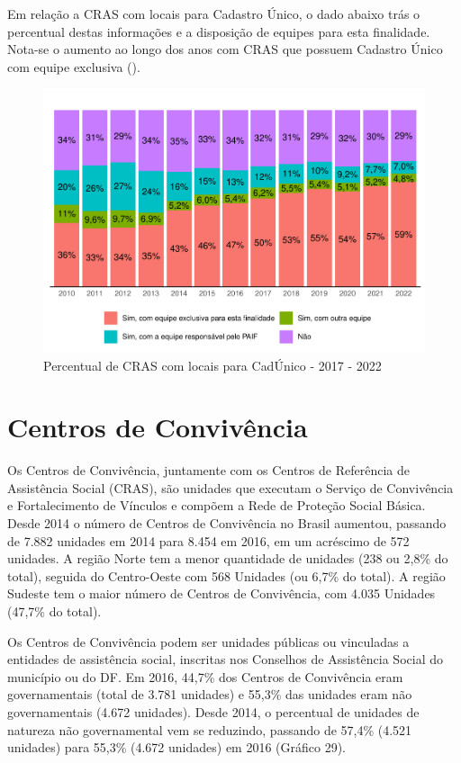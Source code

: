 \documentclass[
  brazilian]{report}
\begin{document}
Em relação a CRAS com locais para Cadastro Único, o dado abaixo trás o
percentual destas informações e a disposição de equipes para esta
finalidade. Nota-se o aumento ao longo dos anos com CRAS que possuem
Cadastro Único com equipe exclusiva ().

\begin{figure}
\includegraphics{Censo-SUAS-2022_files/figure-latex/equip-cadunico-cras-1} \caption[Percentual de CRAS com locais para CadÚnico - 2017 - 2022]{Percentual de CRAS com locais para CadÚnico - 2017 - 2022}\label{fig:equip-cadunico-cras}
\end{figure}

\hypertarget{centros-de-convivuxeancia}{%
\section{Centros de Convivência}\label{centros-de-convivuxeancia}}

Os Centros de Convivência, juntamente com os Centros de Referência de
Assistência Social (CRAS), são unidades que executam o Serviço de
Convivência e Fortalecimento de Vínculos e compõem a Rede de Proteção
Social Básica. Desde 2014 o número de Centros de Convivência no Brasil
aumentou, passando de 7.882 unidades em 2014 para 8.454 em 2016, em um
acréscimo de 572 unidades. A região Norte tem a menor quantidade de
unidades (238 ou 2,8\% do total), seguida do Centro-Oeste com 568
Unidades (ou 6,7\% do total). A região Sudeste tem o maior número de
Centros de Convivência, com 4.035 Unidades (47,7\% do total).

Os Centros de Convivência podem ser unidades públicas ou vinculadas a
entidades de assistência social, inscritas nos Conselhos de Assistência
Social do município ou do DF. Em 2016, 44,7\% dos Centros de Convivência
eram governamentais (total de 3.781 unidades) e 55,3\% das unidades eram
não governamentais (4.672 unidades). Desde 2014, o percentual de
unidades de natureza não governamental vem se reduzindo, passando de
57,4\% (4.521 unidades) para 55,3\% (4.672 unidades) em 2016 (Gráfico
29).
\end{document}
